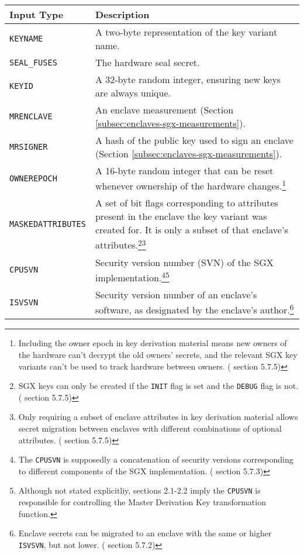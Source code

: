 \begin{tabularx}{\textwidth}{|l|X|}
\caption{Key Derivation Material}
\label{table:sgx-key-derivation-material}\\
\hline
    Input Type & Description \\
\hline\hline
    {\tt KEYNAME} & A two-byte representation of the key variant name. \\
\hline
    {\tt SEAL\_FUSES} & The hardware seal secret. \\
\hline
    {\tt KEYID} & A 32-byte random integer, ensuring new keys are always unique. \\
\hline
    {\tt MRENCLAVE} & An enclave measurement (Section \ref{subsec:enclaves-sgx-measurements}). \\
\hline
    {\tt MRSIGNER} & A hash of the public key used to sign an enclave (Section \ref{subsec:enclaves-sgx-measurements}). \\
\hline
    {\tt OWNEREPOCH} & A 16-byte random integer that can be reset whenever ownership of the hardware changes.\footnote{Including the owner epoch in key derivation material means new owners of the hardware can't decrypt the old owners' secrets, and the relevant SGX key variants can't be used to track hardware between owners. (\cite{intel-sgx-explained-advanced} section 5.7.5)} \\
\hline
    {\tt MASKEDATTRIBUTES} & A set of bit flags corresponding to attributes present in the enclave the key variant was created for. It is only a subset of that enclave's attributes.\footnote{SGX keys can only be created if the {\tt INIT} flag is set and the {\tt DEBUG} flag is not. (\cite{intel-sgx-explained-advanced} section 5.7.5)}\footnote{Only requiring a subset of enclave attributes in key derivation material allows secret migration between enclaves with different combinations of optional attributes. (\cite{intel-sgx-explained-advanced} section 5.7.5)} \\
\hline
    {\tt CPUSVN} & Security version number (SVN) of the SGX implementation.\footnote{The {\tt CPUSVN} is supposedly a concatenation of security versions corresponding to different components of the SGX implementation. (\cite{intel-sgx-explained-advanced} section 5.7.3)}\footnote{Although not stated explicitliy, \cite{sgx-epid-provisioning-attestation} sections 2.1-2.2 imply the {\tt CPUSVN} is responsible for controlling the Master Derivation Key transformation function.} \\
\hline
    {\tt ISVSVN} & Security version number of an enclave's software, as designated by the enclave's author.\footnote{Enclave secrets can be migrated to an enclave with the same or higher {\tt ISVSVN}, but not lower. (\cite{intel-sgx-explained-advanced} section 5.7.2)} \\

\end{tabularx}
